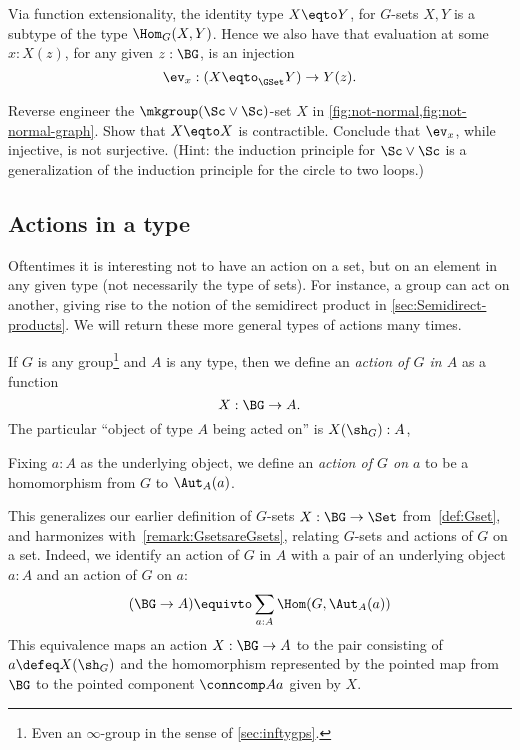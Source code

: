 Via function extensionality,
the identity type $X \eqto Y$, for $G$-sets $X,Y$
is a subtype of the type $\Hom_G(X,Y)$.
Hence we also have that evaluation at some $x:X(z)$,
for any given $z:\BG$, is an injection
\[
  \ev_x:(X \eqto_{\GSet} Y)\to Y(z).
\]
\begin{xca}\label{xca:not-normal}
Reverse engineer the $\mkgroup(\Sc\vee\Sc)$-set $X$ in 
\cref{fig:not-normal,fig:not-normal-graph}.
Show that $X\eqto X$ is contractible.
Conclude that $\ev_x$, while injective, is not surjective.
(Hint: the induction principle for $\Sc\vee\Sc$ is a generalization
of the induction principle for the circle to two loops.)
\end{xca}

\subsection{Actions in a type}
\label{sec:actions}
Oftentimes it is interesting not to have an action on a set, 
but on an element in any given type (not necessarily the type of sets).  
For instance, a group can act on another, giving rise to the notion of 
the semidirect product in \cref{sec:Semidirect-products}.  
We will return these more general types of actions many times.

\begin{definition}\label{action}
  If $G$ is any group\footnote{%
  Even an $\infty$-group in the sense of \cref{sec:inftygps}.}
  and $A$ is any type,
  then we define an \emph{action of $G$ in $A$} as a function
  \[
    X : \BG \to A.
  \]
  The particular ``object of type $A$ being acted on'' is $X(\sh_G):A$,

  Fixing $a:A$ as the underlying object, 
  we define an \emph{action of $G$ on $a$}
  to be a homomorphism from $G$ to $\Aut_A(a)$.%
\end{definition}
This generalizes our earlier definition of $G$-sets $X : \BG \to \Set$
from~\cref{def:Gset},
and harmonizes with~\cref{remark:GsetsareGsets}, relating $G$-sets and
actions of $G$ on a set.
Indeed, we identify
an action of $G$ in $A$ with a pair of an underlying object
$a:A$ and an action of $G$ on $a$:
\[
  (\BG \to A) \equivto \sum_{a:A}\Hom(G,\Aut_A(a))
\]
This equivalence maps an action $X:\BG\to A$
to the pair consisting of $a \defeq X(\sh_G)$
and the homomorphism represented by the pointed map
from $\BG$ to the pointed component $\conncomp A a$ given by $X$.

